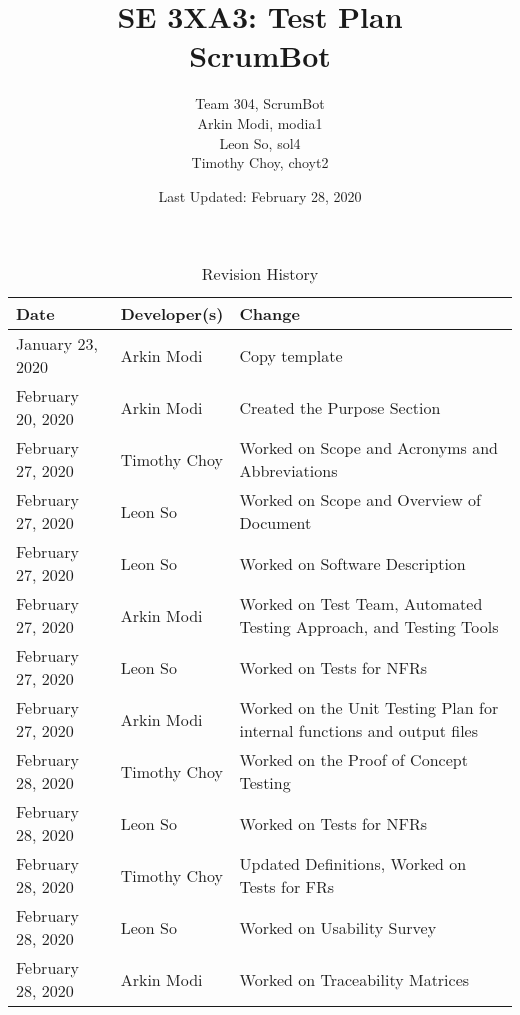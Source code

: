 \documentclass[12pt, titlepage]{article}
\title{SE 3XA3: Test Plan\\ScrumBot}
\author{
	Team 304, ScrumBot
		\\ Arkin Modi, modia1
        \\ Leon So, sol4
        \\ Timothy Choy, choyt2
}
\date{Last Updated: February 28, 2020}
\begin{document}
\newpage
\maketitle

\tableofcontents
\listoftables
\listoffigures

\newpage

\begin{table}[!hbp]
    \caption{Revision History} \label{TblRevisionHistory}
    \begin{tabularx}{\textwidth}{llX}
        \toprule
            \textbf{Date} & \textbf{Developer(s)} & \textbf{Change}\\
        \midrule
            January 23, 2020 & Arkin Modi & Copy template\\
            February 20, 2020 & Arkin Modi & Created the Purpose Section\\
            February 27, 2020 & Timothy Choy & Worked on Scope and Acronyms and Abbreviations\\
            February 27, 2020 & Leon So & Worked on Scope and Overview of Document\\
            February 27, 2020 & Leon So & Worked on Software Description\\
            February 27, 2020 & Arkin Modi & Worked on Test Team, Automated Testing Approach, and Testing Tools\\
            February 27, 2020 & Leon So & Worked on Tests for NFRs\\
            February 27, 2020 & Arkin Modi & Worked on the Unit Testing Plan for internal functions and output files\\
            February 28, 2020 & Timothy Choy & Worked on the Proof of Concept Testing\\
            February 28, 2020 & Leon So & Worked on Tests for NFRs\\
            February 28, 2020 & Timothy Choy & Updated Definitions, Worked on Tests for FRs\\
            February 28, 2020 & Leon So & Worked on Usability Survey\\
            February 28, 2020 & Arkin Modi & Worked on Traceability Matrices\\
        \bottomrule
    \end{tabularx}
\end{table}


\newpage

\end{document}
